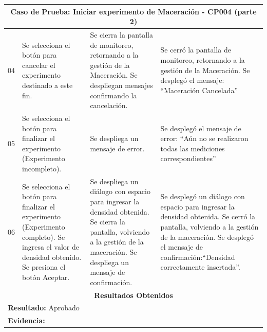         \begin{minipage}{0.95\textwidth}
        \begin{center}
        \begin{tabularx}{\textwidth}{ | p{2cm} | X | X | X |}
        \hline
        \multicolumn{4}{|c|}{\textbf{Caso de Prueba: Iniciar experimento de Maceración - CP004 (parte 2)}} \\
        \hline
        04 & Se selecciona el botón para cancelar el experimento destinado a este fin. & Se cierra la pantalla de monitoreo, retornando a la gestión de la Maceración. Se despliegan mensajes confirmando la cancelación. & Se cerró la pantalla de monitoreo, retornando a la gestión de la Maceración. Se desplegó el mensaje: ``Maceración Cancelada'' \\
        \hline
        05 & Se selecciona el botón para finalizar el experimento (Experimento incompleto). & Se despliega un mensaje de error. & Se desplegó el mensaje de error: ``Aún no se realizaron todas las mediciones correspondientes'' \\
        \hline
        06 & Se selecciona el botón para finalizar el experimento (Experimento completo). Se ingresa el valor de densidad obtenido. Se presiona el botón Aceptar. & Se despliega un diálogo con espacio para ingresar la densidad obtenida. Se cierra la pantalla, volviendo a la gestión de la maceración. Se despliega un mensaje de confirmación. & Se desplegó un diálogo con espacio para ingresar la densidad obtenida. Se cerró la pantalla, volviendo a la gestión de la maceración. Se desplegó el mensaje de confirmación:``Densidad correctamente insertada''. \\
        \hline
        
        \multicolumn{4}{|c|}{\textbf{Resultados Obtenidos}} \\
        \hline
        \multicolumn{4}{|l|}{\textbf{Resultado:} Aprobado} \\
        \hline
        \multicolumn{4}{|l|}{\textbf{Evidencia: }} \\
        \hline
     \end{tabularx}
    \label{CP004-p2}
    \end{center}
    \end{minipage}
    
